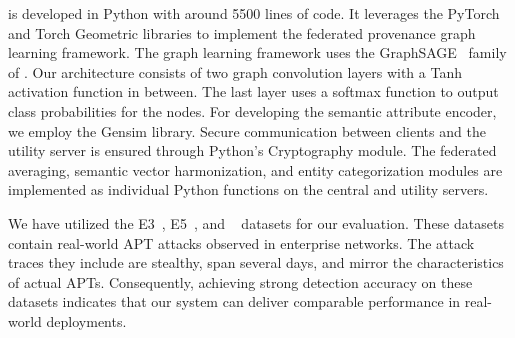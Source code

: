  \Sys is developed in Python with around 5500 lines of code. It leverages the PyTorch and Torch Geometric libraries to implement the federated provenance graph learning framework. The graph learning framework uses the GraphSAGE~\cite{hamilton2017inductive} family of \gnnshort. Our architecture consists of two graph convolution layers with a Tanh activation function in between. The last layer uses a softmax function to output class probabilities for the nodes. For developing the semantic attribute encoder, we employ the Gensim library. Secure communication between clients and the utility server is ensured through Python's Cryptography module. The federated averaging, semantic vector harmonization, and entity categorization modules are implemented as individual Python functions on the central and utility servers.


 We have utilized the \darpa E3~\cite{error3}, E5~\cite{bug5}, and \optc~\cite{darpaoptc} datasets for our evaluation. These datasets contain real-world APT attacks observed in enterprise networks. The attack traces they include are stealthy, span several days, and mirror the characteristics of actual APTs. Consequently, achieving strong detection accuracy on these datasets indicates that our system can deliver comparable performance in real-world deployments.

